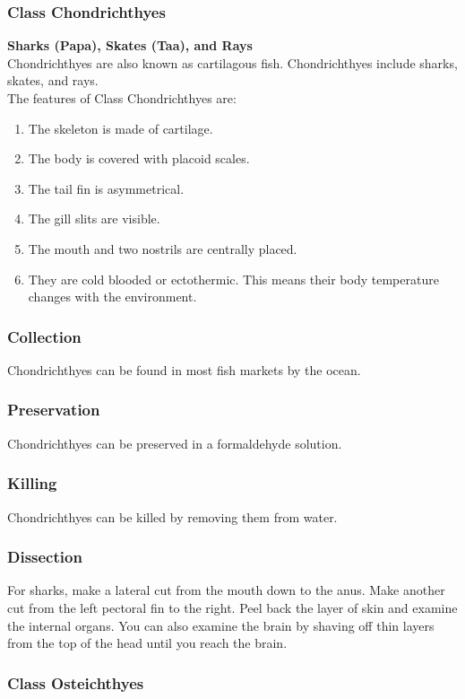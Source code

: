 \subsubsection{Class Chondrichthyes}
\textbf{Sharks (Papa), Skates (Taa), and Rays}\\
Chondrichthyes are also known as cartilagous fish. Chondrichthyes include sharks, skates, and rays.\\
The features of Class Chondrichthyes are:
\begin{enumerate}
\item{The skeleton is made of cartilage.}
\item{The body is covered with placoid scales.}
\item{The tail fin is asymmetrical.}
\item{The gill slits are visible.}
\item{The mouth and two nostrils are centrally placed.}
\item{They are cold blooded or ectothermic. This means their body temperature changes with the environment.}
\end{enumerate}

\subsubsection{Collection}
Chondrichthyes can be found in most fish markets by the ocean. 

\subsubsection{Preservation} 
Chondrichthyes can be preserved in a formaldehyde solution.

\subsubsection{Killing}
Chondrichthyes can be killed by removing them from water. 

\subsubsection{Dissection}
For sharks, make a lateral cut from the mouth down to the anus. Make another cut from the left pectoral fin to the right. Peel back the layer of skin and examine the internal organs. You can also examine the brain by shaving off thin layers from the top of the head until you reach the brain.

\subsubsection{Class Osteichthyes}

